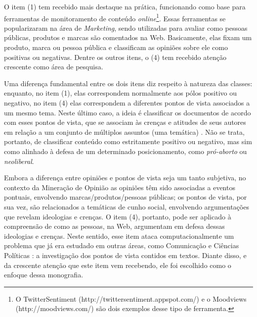 O item (1) tem recebido mais destaque na prática, funcionando como base para ferramentas de monitoramento de conteúdo \emph{online}\footnote{O TwitterSentiment (http://twittersentiment.appspot.com/) e o Moodviews (http://moodviews.com/) são dois exemplos desse tipo de ferramenta.}. Essas ferramentas se popularizaram na área de \emph{Marketing}, sendo utilizadas para avaliar como pessoas públicas, produtos e marcas são comentados na Web. Basicamente, elas fixam um produto, marca ou pessoa pública e classificam as opiniões sobre ele como positivas ou negativas. Dentre os outros itens, o (4) tem recebido  atenção crescente como área de pesquisa. %

Uma diferença fundamental entre os dois itens diz respeito à natureza das classes: enquanto, no item (1), elas correspondem normalmente aos pólos positivo ou negativo, no item (4) elas correspondem a diferentes pontos de vista associados a um mesmo tema. Neste último caso, a ideia é classificar os documentos de acordo com esses pontos de vista, que se associam às crenças e atitudes de seus autores em relação a um conjunto de múltiplos assuntos (uma temática) \cite{omsa}. Não se trata, portanto, de classificar conteúdo como estritamente positivo ou negativo, mas sim como alinhado à defesa de um determinado posicionamento, como \emph{pró-aborto} ou \emph{neoliberal}. 

Embora a diferença entre opiniões e pontos de vista seja um tanto subjetiva, no contexto da Mineração de Opinião as opiniões têm sido associadas a eventos pontuais, envolvendo marcas/produtos/pessoas públicas; os pontos de vista, por sua vez, são relacionados a temáticas de cunho social, envolvendo argumentações que revelam ideologias e crenças. O item (4), portanto, pode ser aplicado à compreensão de como as pessoas, na Web, argumentam em defesa dessas ideologias e crenças. Neste sentido, esse item ataca computacionalmente um problema que já era estudado em outras áreas, como Comunicação e Ciências Políticas \cite{gentzkow, milyo, fader}: a investigação dos pontos de vista contidos em textos. Diante disso, e da crescente atenção que este item vem recebendo, ele foi escolhido como o enfoque dessa monografia. 

